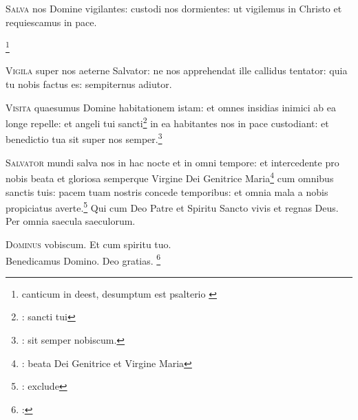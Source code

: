 \lettrine{S}{alva} nos Domine vigilantes:
custodi nos dormientes:
ut vigilemus in Christo
et requiescamus in pace.

\begin{psalmus}
  \footnote{%
    canticum in \cite{diu1523} deest,
    desumptum est psalterio \cite{ps1502}}
  
\end{psalmus}

\begin{psalmus}
  

\end{psalmus}

\lettrine{V}{igila} super nos aeterne Salvator:
ne nos apprehendat ille callidus tentator:
quia tu nobis factus es: sempiternus adiutor.

\lettrine{V}{isita} quaesumus Domine habitationem istam:
et omnes insidias inimici ab ea longe repelle:
et angeli tui sancti\footnote{\cite[121r]{bp1502}: sancti tui}
in ea habitantes nos in pace custodiant:
et benedictio tua sit super nos semper.\footnote{\cite[121r]{bp1502}: sit semper nobiscum.}

\lettrine{S}{alvator} mundi salva nos in hac nocte et in omni tempore:
et intercedente pro nobis
beata et gloriosa semperque Virgine Dei Genitrice Maria\footnote{%
  \cite[121r]{bp1502}: beata Dei Genitrice et Virgine Maria}
cum omnibus sanctis tuis:
pacem tuam nostris concede temporibus:
et omnia mala a nobis propiciatus
averte.\footnote{\cite[121r]{bp1502}: exclude}
Qui cum Deo Patre et Spiritu Sancto vivis et regnas Deus.
Per omnia saecula saeculorum.

\lettrine{D}{ominus} vobiscum.
Et cum spiritu tuo.\\
Benedicamus Domino. Deo gratias.
\footnote{%
  \cite[121r, 207v]{bp1502}:
}

